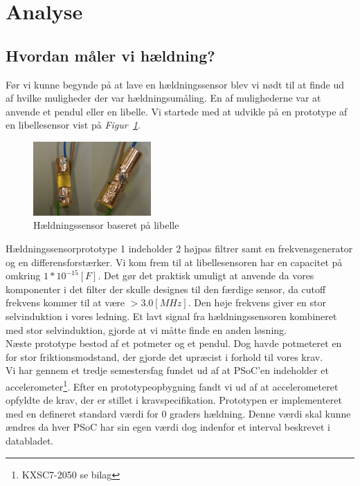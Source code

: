 \section{Analyse}
\subsection{Hvordan måler vi hældning?}
Før vi kunne begynde på at lave en hældningssensor blev vi nødt til at finde ud af hvilke muligheder der var hældningsumåling. En af mulighederne var at anvende et pendul eller en libelle. Vi startede med at udvikle på en prototype af en libellesensor vist på \textit{Figur~\ref{fig:libelle}}.
\begin{figure}[hbpt]
\centering
\includegraphics[width=0.4\textwidth]{billeder/libellesensor1}
\caption{Hældningssensor baseret på libelle}
\label{fig:libelle}
\end{figure}
Hældningssensorprototype 1 indeholder 2 højpas filtrer samt en frekvensgenerator og en differensforstærker. Vi kom frem til at libellesensoren har en capacitet på omkring $1*10^{-15}[F]$. Det gør det praktisk umuligt at anvende da vores komponenter i det filter der skulle designes til den færdige sensor, da cutoff frekvens kommer til at være $>3.0[MHz]$. Den høje frekvens giver en stor selvinduktion i vores ledning. Et lavt signal fra hældningssensoren kombineret med stor selvinduktion, gjorde at vi måtte finde en anden løsning.\\
Næste prototype bestod af et potmeter og et pendul. Dog havde potmeteret en for stor friktionsmodstand, der gjorde det upræcist i forhold til vores krav.\\
Vi har gennem et tredje semestersfag fundet ud af at PSoC'en indeholder et accelerometer\footnote{KXSC7-2050 se bilag}. Efter en prototypeopbygning fandt vi ud af at accelerometeret opfyldte de krav, der er stillet i kravspecifikation. Prototypen er implementeret med en defineret standard værdi for 0 graders hældning. Denne værdi skal kunne ændres da hver PSoC har sin egen værdi dog indenfor et interval beskrevet i databladet.
